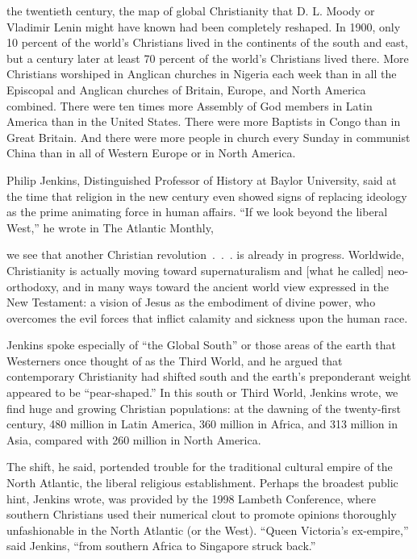 
 the twentieth century, the map of global Christianity that D. L. Moody or
Vladimir Lenin might have known had been completely reshaped. In 1900, only 10 percent of the
world’s Christians lived in the continents of the south and east, but a century later at least 70
percent of the world’s Christians lived there. More Christians worshiped in Anglican churches in
Nigeria each week than in all the Episcopal and Anglican churches of Britain, Europe, and North
America combined. There were ten times more Assembly of God members in Latin America than in the
United States. There were more Baptists in Congo than in Great Britain. And there were more people
in church every Sunday in communist China than in all of Western Europe or in North America.

Philip Jenkins, Distinguished Professor of History at Baylor University, said at the time that
religion in the new century even showed signs of replacing ideology as the prime animating force in
human affairs. “If we look beyond the liberal West,” he wrote in The Atlantic Monthly,

\begin{blockquote}
we see that another Christian revolution~.~.~. is already in progress. Worldwide, Christianity is
actually moving toward supernaturalism and [what he called] neo-orthodoxy, and in many ways toward
the ancient world view expressed in the New Testament: a vision of Jesus as the embodiment of divine
power, who overcomes the evil forces that inflict calamity and sickness upon the human race.
\end{blockquote}

Jenkins spoke especially of “the Global South” or those areas of the earth that Westerners once
thought of as the Third World, and he argued that contemporary Christianity had shifted south and
the earth’s preponderant weight appeared to be “pear-shaped.” In this south or Third World, Jenkins
wrote, we find huge and growing Christian populations: at the dawning of the twenty-first century,
480 million in Latin America, 360 million in Africa, and 313 million in Asia, compared with 260
million in North America.

The shift, he said, portended trouble for the traditional cultural empire of the North Atlantic, the
liberal religious establishment. Perhaps the broadest public hint, Jenkins wrote, was provided by
the 1998 Lambeth Conference, where southern Christians used their numerical clout to promote
opinions thoroughly unfashionable in the North Atlantic (or the West). “Queen Victoria’s ex-empire,”
said Jenkins, “from southern Africa to Singapore struck back.”

